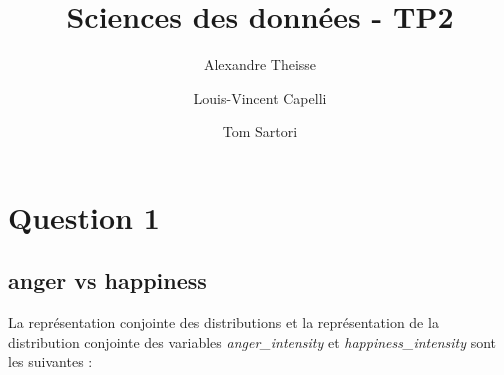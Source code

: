 \documentclass{article}
\title{Sciences des données - TP2}
\author{Alexandre Theisse \and Louis-Vincent Capelli \and Tom Sartori}
\begin{document}
\maketitle
\newpage

\section*{Question 1}

\subsection*{anger vs happiness}

La représentation conjointe des distributions et la représentation de la 
distribution conjointe des variables 
\textit{anger\_intensity} et \textit{happiness\_intensity}
sont les suivantes :
\end{document}
